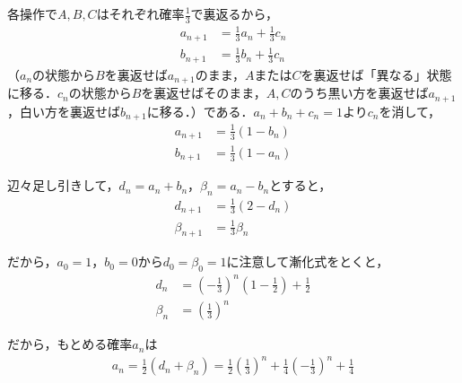 \documentclass[../main.tex]{subfiles}
\begin{document}
各操作で$A,B,C$はそれぞれ確率$\frac13$で裏返るから，
\begin{align*}
  a_{n+1}&=\frac13a_n+\frac13c_n\\
  b_{n+1}&=\frac13b_n+\frac13c_n
\end{align*}
（$a_n$の状態から$B$を裏返せば$a_{n+1}$のまま，$A$または$C$を裏返せば「異なる」状態に移る．$c_n$の状態から$B$を裏返せばそのまま，$A,C$のうち黒い方を裏返せば$a_{n+1}$，白い方を裏返せば$b_{n+1}$に移る．）である．$a_n+b_n+c_n=1$より$c_n$を消して，
\begin{align*}
  a_{n+1}&=\frac13(1-b_n)\\
  b_{n+1}&=\frac13(1-a_n)
\end{align*}

辺々足し引きして，$d_n=a_n+b_n$，$\beta_n=a_n-b_n$とすると，
\begin{align*}
  d_{n+1}&=\frac13(2-d_n)\\
  \beta_{n+1}&=\frac13\beta_n
\end{align*}

だから，$a_0=1$，$b_0=0$から$d_0=\beta_0=1$に注意して漸化式をとくと，
\begin{align*}
  d_n&=\left(-\frac13\right)^n\left(1-\frac12\right)+\frac12\\
  \beta_n&=\left(\frac13\right)^n
\end{align*}

だから，もとめる確率$a_n$は
\begin{align*}
  a_n=\frac12(d_n+\beta_n)=\frac12\left(\frac13\right)^n+\frac14\left(-\frac13\right)^n+\frac14
\end{align*}
\end{document}

